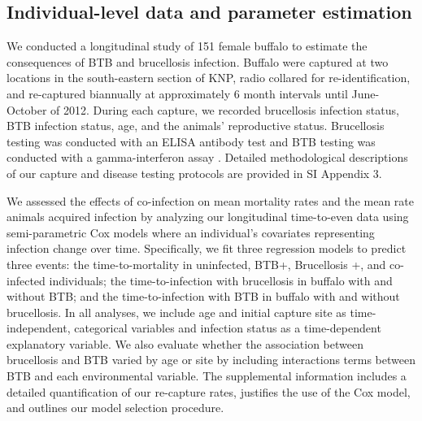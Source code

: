 \documentclass[10pt,letterpaper]{article}
\begin{document}
\subsection*{Individual-level data and parameter estimation}
We conducted a longitudinal study of 151 female buffalo to estimate the consequences of BTB and brucellosis infection. Buffalo were captured at two locations in the south-eastern section of KNP, radio collared for re-identification, and re-captured biannually at approximately 6 month intervals until June-October of 2012.  During each capture, we recorded brucellosis infection status, BTB infection status, age, and the animals’ reproductive status. Brucellosis testing was conducted with an ELISA antibody test and BTB testing was conducted with a gamma-interferon assay  \cite{gorsich_evaluation_2015, michel_approaches_2011}. Detailed methodological descriptions of our capture and disease testing protocols are provided in SI Appendix 3.


We assessed the effects of co-infection on mean mortality rates and the mean rate animals acquired infection by analyzing our longitudinal time-to-even data using semi-parametric Cox models where an individual’s covariates representing infection change over time. Specifically, we fit three regression models to predict three events: the time-to-mortality in uninfected, BTB+, Brucellosis +, and co-infected individuals; the time-to-infection with brucellosis in buffalo with and without BTB; and the time-to-infection with BTB in buffalo with and without brucellosis. In all analyses, we include age and initial capture site as time-independent, categorical variables and infection status as a time-dependent explanatory variable. We also evaluate whether the association between brucellosis and BTB varied by age or site by including interactions terms between BTB and each environmental variable. The supplemental information includes a detailed quantification of our re-capture rates, justifies the use of the Cox model, and outlines our model selection procedure. 
\end{document}

